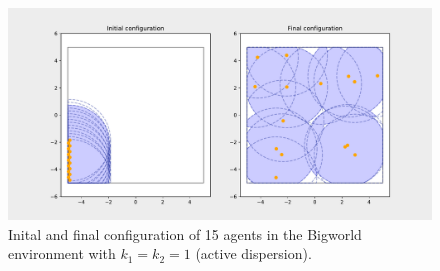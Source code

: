 \begin{figure}[H]
  \centering
  \includegraphics[width=\textwidth]{figs/bigworld_15_agnt_k_1_1_k_2_1_distr.pdf}
  \caption{Inital and final configuration of 15 agents in the Bigworld environment with $k_{1} = k_{2} = 1$ (active dispersion).}
  \label{fig:15_agnt_bw_k_1_1_k_2_1_distr}
\end{figure}
